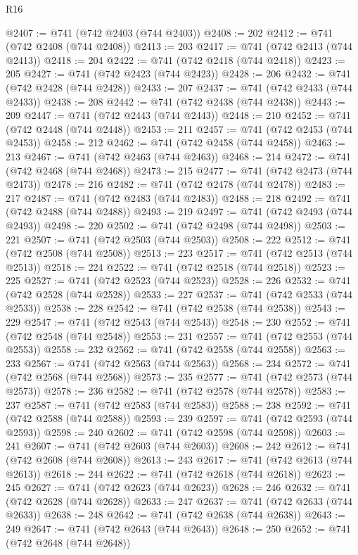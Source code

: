 \begin{lexlean}{R16}
\begin{coremodule}
@2407 := @741 (@742 @2403 (@744 @2403))
@2408 := 202
@2412 := @741 (@742 @2408 (@744 @2408))
@2413 := 203
@2417 := @741 (@742 @2413 (@744 @2413))
@2418 := 204
@2422 := @741 (@742 @2418 (@744 @2418))
@2423 := 205
@2427 := @741 (@742 @2423 (@744 @2423))
@2428 := 206
@2432 := @741 (@742 @2428 (@744 @2428))
@2433 := 207
@2437 := @741 (@742 @2433 (@744 @2433))
@2438 := 208
@2442 := @741 (@742 @2438 (@744 @2438))
@2443 := 209
@2447 := @741 (@742 @2443 (@744 @2443))
@2448 := 210
@2452 := @741 (@742 @2448 (@744 @2448))
@2453 := 211
@2457 := @741 (@742 @2453 (@744 @2453))
@2458 := 212
@2462 := @741 (@742 @2458 (@744 @2458))
@2463 := 213
@2467 := @741 (@742 @2463 (@744 @2463))
@2468 := 214
@2472 := @741 (@742 @2468 (@744 @2468))
@2473 := 215
@2477 := @741 (@742 @2473 (@744 @2473))
@2478 := 216
@2482 := @741 (@742 @2478 (@744 @2478))
@2483 := 217
@2487 := @741 (@742 @2483 (@744 @2483))
@2488 := 218
@2492 := @741 (@742 @2488 (@744 @2488))
@2493 := 219
@2497 := @741 (@742 @2493 (@744 @2493))
@2498 := 220
@2502 := @741 (@742 @2498 (@744 @2498))
@2503 := 221
@2507 := @741 (@742 @2503 (@744 @2503))
@2508 := 222
@2512 := @741 (@742 @2508 (@744 @2508))
@2513 := 223
@2517 := @741 (@742 @2513 (@744 @2513))
@2518 := 224
@2522 := @741 (@742 @2518 (@744 @2518))
@2523 := 225
@2527 := @741 (@742 @2523 (@744 @2523))
@2528 := 226
@2532 := @741 (@742 @2528 (@744 @2528))
@2533 := 227
@2537 := @741 (@742 @2533 (@744 @2533))
@2538 := 228
@2542 := @741 (@742 @2538 (@744 @2538))
@2543 := 229
@2547 := @741 (@742 @2543 (@744 @2543))
@2548 := 230
@2552 := @741 (@742 @2548 (@744 @2548))
@2553 := 231
@2557 := @741 (@742 @2553 (@744 @2553))
@2558 := 232
@2562 := @741 (@742 @2558 (@744 @2558))
@2563 := 233
@2567 := @741 (@742 @2563 (@744 @2563))
@2568 := 234
@2572 := @741 (@742 @2568 (@744 @2568))
@2573 := 235
@2577 := @741 (@742 @2573 (@744 @2573))
@2578 := 236
@2582 := @741 (@742 @2578 (@744 @2578))
@2583 := 237
@2587 := @741 (@742 @2583 (@744 @2583))
@2588 := 238
@2592 := @741 (@742 @2588 (@744 @2588))
@2593 := 239
@2597 := @741 (@742 @2593 (@744 @2593))
@2598 := 240
@2602 := @741 (@742 @2598 (@744 @2598))
@2603 := 241
@2607 := @741 (@742 @2603 (@744 @2603))
@2608 := 242
@2612 := @741 (@742 @2608 (@744 @2608))
@2613 := 243
@2617 := @741 (@742 @2613 (@744 @2613))
@2618 := 244
@2622 := @741 (@742 @2618 (@744 @2618))
@2623 := 245
@2627 := @741 (@742 @2623 (@744 @2623))
@2628 := 246
@2632 := @741 (@742 @2628 (@744 @2628))
@2633 := 247
@2637 := @741 (@742 @2633 (@744 @2633))
@2638 := 248
@2642 := @741 (@742 @2638 (@744 @2638))
@2643 := 249
@2647 := @741 (@742 @2643 (@744 @2643))
@2648 := 250
@2652 := @741 (@742 @2648 (@744 @2648))

\end{coremodule}
\end{lexlean}
